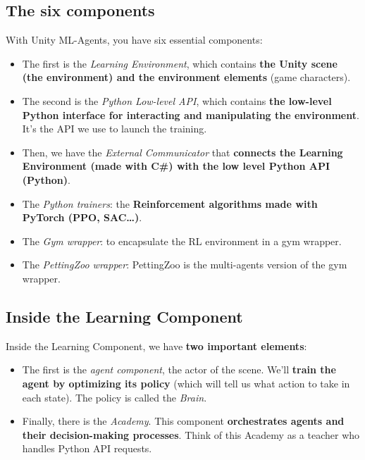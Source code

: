 \documentclass[11pt,a4paper]{article}
\begin{document}

\subsection{The six components}\label{the-six-components}

With Unity ML-Agents, you have six essential components:


\begin{itemize}
\tightlist
\item
  The first is the \emph{Learning Environment}, which contains \textbf{the Unity scene (the environment) and the environment elements} (game characters).
\item
  The second is the \emph{Python Low-level API}, which contains \textbf{the low-level Python interface for interacting and manipulating the environment}. It's the API we use to launch the training.
\item
  Then, we have the \emph{External Communicator} that \textbf{connects the Learning Environment (made with C\#) with the low level Python API (Python)}.
\item
  The \emph{Python trainers}: the \textbf{Reinforcement algorithms made with PyTorch (PPO, SAC\ldots)}.
\item
  The \emph{Gym wrapper}: to encapsulate the RL environment in a gym wrapper.
\item
  The \emph{PettingZoo wrapper}: PettingZoo is the multi-agents version of the gym wrapper.
\end{itemize}

\subsection{Inside the Learning Component}\label{inside-the-learning-component}

Inside the Learning Component, we have \textbf{two important elements}:

\begin{itemize}
\tightlist
\item
  The first is the \emph{agent component}, the actor of the scene. We'll \textbf{train the agent by optimizing its policy} (which will tell us what action to take in each state). The policy is called the \emph{Brain}.
\item
  Finally, there is the \emph{Academy}. This component \textbf{orchestrates agents and their decision-making processes}. Think of this Academy as a teacher who handles Python API requests.
\end{itemize}
\end{document}
